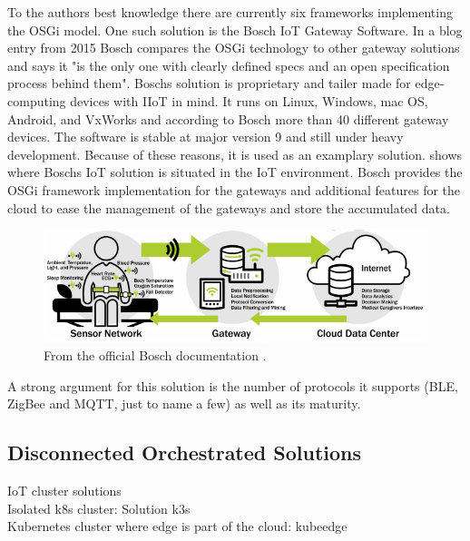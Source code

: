 To the authors best knowledge there are currently six frameworks implementing the OSGi model. One such solution is the Bosch IoT Gateway Software\cite{BoschIoT13:online}. In a blog entry from 2015 Bosch compares the OSGi technology to other gateway solutions and says it "is the only one with clearly defined specs and an open specification process behind them"\cite{boschBlogOSGi69:online}. Boschs solution is proprietary and tailer made for edge-computing devices with IIoT in mind\cite{OSGiforIoTBlog27:online}. It runs on Linux, Windows, mac OS, Android, and VxWorks and according to Bosch more than 40 different gateway devices\cite{BoschIoT13:online}. The software is stable at major version 9 and still under heavy development. Because of these reasons, it is used as an examplary solution.  shows where Boschs IoT solution is situated in the IoT environment. Bosch provides the OSGi framework implementation for the gateways and additional features for the cloud to ease the management of the gateways and store the accumulated data.
\begin{figure}[h!]
    \centering
    \includegraphics[scale=1.8]{figures/iotSetup.png}
    \caption{From the official Bosch documentation \cite{BoschIoT13:online}.}
    \label{fig:boschIoTGatewaySetup}
\end{figure}
A strong argument for this solution is the number of protocols it supports (BLE, ZigBee and MQTT, just to name a few) as well as its maturity.




\subsection{Disconnected Orchestrated Solutions}
IoT cluster solutions\\
Isolated k8s cluster: Solution k3s\\
Kubernetes cluster where edge is part of the cloud: kubeedge\\




